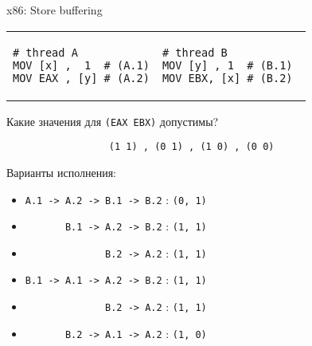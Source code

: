 \begin{frame}{x86: Store buffering}

\begin{tabular}{p{} p{}}
\begin{verbatim}
# thread A
MOV [x] ,  1  # (A.1)
MOV EAX , [y] # (A.2)
\end{verbatim}

& 

\begin{verbatim}
# thread B          
MOV [y] , 1  # (B.1) 
MOV EBX, [x] # (B.2) 
\end{verbatim}
\end{tabular}

Какие значения для \texttt{(EAX EBX)} допустимы?

\texttt{\ \ \ \ \ \ \ \ \ \ \ \ \ \ \ \ \ \ (1 1)\ , (0 1)\ , (1 0)\ , (0 0)}

Варианты исполнения:
\begin{itemize}
    \item \texttt{A.1 -> A.2 -> B.1 -> B.2}                            : \texttt{(0, 1)}
    \item \texttt{\ \ \ \ \ \ \       B.1 -> A.2 -> B.2}               : \texttt{(1, 1)}
    \item \texttt{\ \ \ \ \ \ \ \ \ \ \ \ \ \              B.2 -> A.2} : \texttt{(1, 1)}
    \item \texttt{B.1 -> A.1 -> A.2 -> B.2}                            : \texttt{(1, 1)}
    \item \texttt{\ \ \ \ \ \ \ \ \ \ \ \ \ \              B.2 -> A.2} : \texttt{(1, 1)}
    \item \texttt{\ \ \ \ \ \ \       B.2 -> A.1 -> A.2}               : \texttt{(1, 0)}
\end{itemize}
\end{frame}

